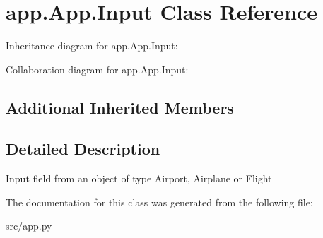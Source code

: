 \hypertarget{classapp_1_1_app_1_1_input}{}\section{app.\+App.\+Input Class Reference}
\label{classapp_1_1_app_1_1_input}


Inheritance diagram for app.\+App.\+Input\+:


Collaboration diagram for app.\+App.\+Input\+:
\subsection*{Additional Inherited Members}


\subsection{Detailed Description}
\begin{DoxyVerb}Input field from an object of type Airport, Airplane or Flight\end{DoxyVerb}
 

The documentation for this class was generated from the following file\+:\begin{DoxyCompactItemize}
\item 
src/app.\+py\end{DoxyCompactItemize}
